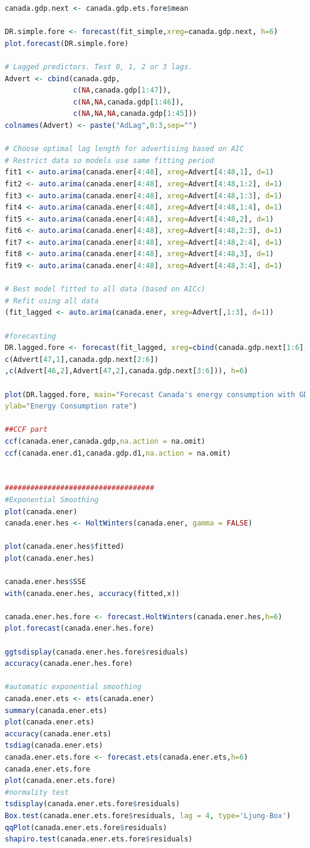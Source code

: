 \documentclass[journal, a4paper]{IEEEtran}
\begin{document}
\begin{appendix}
\begin{lstlisting}[language=R,basicstyle=\tiny]
canada.gdp.next <- canada.gdp.ets.fore$mean

DR.simple.fore <- forecast(fit_simple,xreg=canada.gdp.next, h=6)
plot.forecast(DR.simple.fore)

# Lagged predictors. Test 0, 1, 2 or 3 lags.
Advert <- cbind(canada.gdp,
                c(NA,canada.gdp[1:47]),
                c(NA,NA,canada.gdp[1:46]),
                c(NA,NA,NA,canada.gdp[1:45]))
colnames(Advert) <- paste("AdLag",0:3,sep="")

# Choose optimal lag length for advertising based on AIC
# Restrict data so models use same fitting period
fit1 <- auto.arima(canada.ener[4:48], xreg=Advert[4:48,1], d=1)
fit2 <- auto.arima(canada.ener[4:48], xreg=Advert[4:48,1:2], d=1)
fit3 <- auto.arima(canada.ener[4:48], xreg=Advert[4:48,1:3], d=1)
fit4 <- auto.arima(canada.ener[4:48], xreg=Advert[4:48,1:4], d=1)
fit5 <- auto.arima(canada.ener[4:48], xreg=Advert[4:48,2], d=1)
fit6 <- auto.arima(canada.ener[4:48], xreg=Advert[4:48,2:3], d=1)
fit7 <- auto.arima(canada.ener[4:48], xreg=Advert[4:48,2:4], d=1)
fit8 <- auto.arima(canada.ener[4:48], xreg=Advert[4:48,3], d=1)
fit9 <- auto.arima(canada.ener[4:48], xreg=Advert[4:48,3:4], d=1)

# Best model fitted to all data (based on AICc)
# Refit using all data
(fit_lagged <- auto.arima(canada.ener, xreg=Advert[,1:3], d=1))

#forecasting
DR.lagged.fore <- forecast(fit_lagged, xreg=cbind(canada.gdp.next[1:6],
c(Advert[47,1],canada.gdp.next[2:6])
,c(Advert[46,2],Advert[47,2],canada.gdp.next[3:6])), h=6)

plot(DR.lagged.fore, main="Forecast Canada's energy consumption with GDP", 
ylab="Energy Consumption rate")

##CCF part
ccf(canada.ener,canada.gdp,na.action = na.omit)
ccf(canada.ener.d1,canada.gdp.d1,na.action = na.omit)


###################################
#Exponential Smoothing
plot(canada.ener)
canada.ener.hes <- HoltWinters(canada.ener, gamma = FALSE)

plot(canada.ener.hes$fitted)
plot(canada.ener.hes)

canada.ener.hes$SSE
with(canada.ener.hes, accuracy(fitted,x))

canada.ener.hes.fore <- forecast.HoltWinters(canada.ener.hes,h=6)
plot.forecast(canada.ener.hes.fore)

ggtsdisplay(canada.ener.hes.fore$residuals)
accuracy(canada.ener.hes.fore)

#automatic exponential smoothing
canada.ener.ets <- ets(canada.ener)
summary(canada.ener.ets)
plot(canada.ener.ets)
accuracy(canada.ener.ets)
tsdiag(canada.ener.ets)
canada.ener.ets.fore <- forecast.ets(canada.ener.ets,h=6)
canada.ener.ets.fore
plot(canada.ener.ets.fore)
#normality test
tsdisplay(canada.ener.ets.fore$residuals)
Box.test(canada.ener.ets.fore$residuals, lag = 4, type='Ljung-Box')
qqPlot(canada.ener.ets.fore$residuals)
shapiro.test(canada.ener.ets.fore$residuals)


\end{lstlisting}
\end{appendix}
\end{document}
